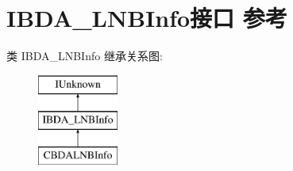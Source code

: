 \hypertarget{interface_i_b_d_a___l_n_b_info}{}\section{I\+B\+D\+A\+\_\+\+L\+N\+B\+Info接口 参考}
\label{interface_i_b_d_a___l_n_b_info}
类 I\+B\+D\+A\+\_\+\+L\+N\+B\+Info 继承关系图\+:\begin{figure}[H]
\begin{center}
\leavevmode
\includegraphics[height=3.000000cm]{interface_i_b_d_a___l_n_b_info}
\end{center}
\end{figure}
